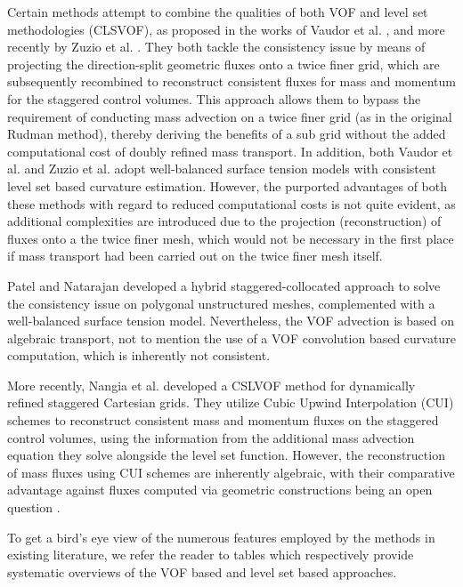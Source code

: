 Certain methods attempt to combine the qualities of both 
VOF and level set methodologies (CLSVOF), as proposed in the works of 
Vaudor et al. , 
and more recently by Zuzio et al. \cite{zuzio2020new}. 
They both tackle the consistency issue by means of projecting 
the direction-split geometric fluxes onto a twice finer grid, 
which are subsequently recombined to reconstruct consistent 
fluxes for mass and momentum for the staggered control volumes. 
This approach allows them to bypass the requirement of conducting 
mass advection on a twice finer grid (as in the original Rudman method), 
thereby deriving the benefits of a sub grid without the 
added computational cost of doubly refined mass transport. 
In addition, both Vaudor et al. \cite{vaudor2017consistent} and 
Zuzio et al.  adopt well-balanced surface tension 
models with consistent level set based curvature estimation. 
However, the purported advantages of both these methods with 
regard to reduced computational costs is not quite evident, 
as additional complexities are introduced due to the projection 
(reconstruction) of fluxes onto a the twice finer mesh, 
which would not be necessary in the first place if mass transport 
had been carried out on the twice finer mesh itself. 


Patel and Natarajan  developed a hybrid 
staggered-collocated approach to solve the consistency issue on 
polygonal unstructured meshes, complemented with a well-balanced surface tension model. 
Nevertheless, the VOF advection is based on algebraic transport, 
not to mention the use of a VOF convolution based 
curvature computation, which is inherently not consistent. 


More recently, Nangia et al.  developed a 
CSLVOF method for dynamically refined staggered Cartesian grids. 
They utilize Cubic Upwind Interpolation (CUI) schemes to 
reconstruct consistent mass and momentum fluxes on the staggered 
control volumes, using the information from the additional mass 
advection equation they solve alongside the level set function.   
However, the reconstruction of mass fluxes using CUI schemes are 
inherently algebraic, with their comparative advantage against fluxes 
computed via geometric constructions being an open question 
.

To get a bird's eye view of the numerous features employed by the methods 
in existing literature, we refer the reader to tables %
which respectively provide systematic overviews of the VOF based and level set based approaches.    

